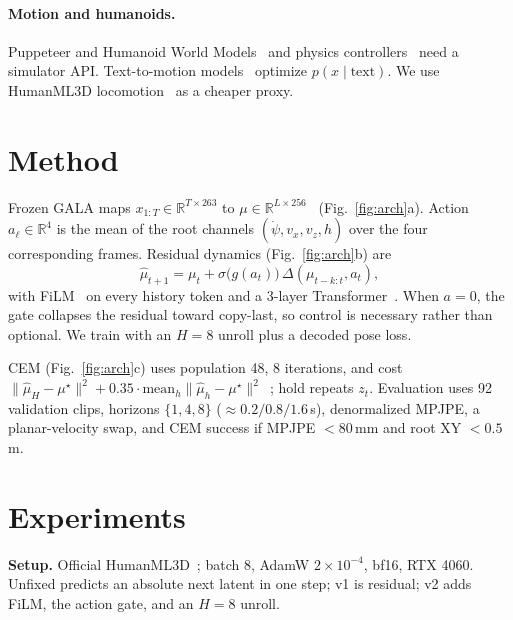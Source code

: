 \documentclass[10pt,twocolumn]{article}
\begin{document}
\paragraph{Motion and humanoids.}
Puppeteer and Humanoid World Models~\cite{hansen2024puppeteer,ali2025hwm} and physics controllers~\cite{peng2018deepmimic,won2022physics,ling2020character,luo2023perpetual,rempe2021humor,yuan2023physdiff} need a simulator API.
Text-to-motion models~\cite{tevet2023mdm,chen2023executing,zhang2023remodiffuse,jiang2024motiongpt,shafir2024human} optimize $p(x\mid\text{text})$.
We use HumanML3D locomotion~\cite{guo2022humanml3d,mahmood2019amass,punnakkal2021babel,loper2015smpl} as a cheaper proxy.

\section{Method}

Frozen GALA maps $x_{1:T}\!\in\!\mathbb{R}^{T\times 263}$ to $\mu\!\in\!\mathbb{R}^{L\times 256}$~\cite{kingma2014vae,loper2015smpl} (Fig.~\ref{fig:arch}a).
Action $a_\ell\in\mathbb{R}^{4}$ is the mean of the root channels $(\dot\psi,v_x,v_z,h)$ over the four corresponding frames.
Residual dynamics (Fig.~\ref{fig:arch}b) are
\begin{equation}
\hat\mu_{t+1}=\mu_t+\sigma\bigl(g(a_t)\bigr)\,\Delta(\mu_{t-k:t},a_t),
\end{equation}
with FiLM~\cite{perez2018film} on every history token and a 3-layer Transformer~\cite{vaswani2017attention,dosovitskiy2021vit}.
When $a{=}0$, the gate collapses the residual toward copy-last, so control is necessary rather than optional.
We train with an $H{=}8$ unroll plus a decoded pose loss.

CEM (Fig.~\ref{fig:arch}c) uses population 48, 8 iterations, and cost $\|\hat\mu_H-\mu^\star\|^2+0.35\cdot\mathrm{mean}_h\|\hat\mu_h-\mu^\star\|^2$~\cite{rubinstein1999cem,zhou2024dinowm}; hold repeats $z_t$.
Evaluation uses 92 validation clips, horizons $\{1,4,8\}$ ($\approx 0.2/0.8/1.6$\,s), denormalized MPJPE, a planar-velocity swap, and CEM success if MPJPE $<80$\,mm and root XY $<0.5$\,m.

\section{Experiments}

\textbf{Setup.} Official HumanML3D~\cite{guo2022humanml3d}; batch 8, AdamW $2{\times}10^{-4}$, bf16, RTX 4060.
Unfixed predicts an absolute next latent in one step; v1 is residual; v2 adds FiLM, the action gate, and an $H{=}8$ unroll.
\end{document}
